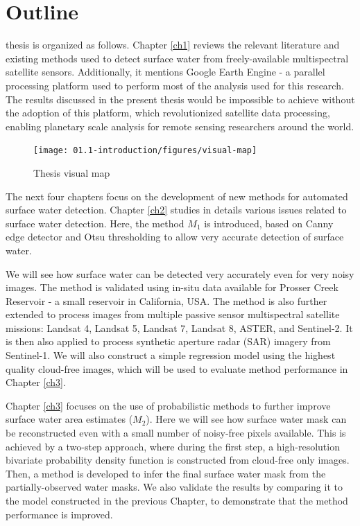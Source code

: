 \section{Outline}

 thesis is organized as follows. Chapter \ref{ch1} reviews the relevant literature and existing methods used to detect surface water from freely-available multispectral satellite sensors. Additionally, it mentions Google Earth Engine - a parallel processing platform used to perform most of the analysis used for this research. The results discussed in the present thesis would be impossible to achieve without the adoption of this platform, which revolutionized satellite data processing, enabling planetary scale analysis for remote sensing researchers around the world. 

\begin{figure}[H]
	\texttt{[image: 01.1-introduction/figures/visual-map]}
	\caption{Thesis visual map}
	\label{fig:outline}
\end{figure}

The next four chapters focus on the development of new methods for automated surface water detection. Chapter \ref{ch2} studies in details various issues related to surface water detection. Here, the method $M_1$ is introduced, based on Canny edge detector and Otsu thresholding to allow very accurate detection of surface water. 

We will see how surface water can be detected very accurately even for very noisy images. The method is validated using in-situ data available for Prosser Creek Reservoir - a small reservoir in California, USA. The method is also further extended to process images from multiple passive sensor multispectral satellite missions: Landsat 4, Landsat 5, Landsat 7, Landsat 8, ASTER, and Sentinel-2. It is then also applied to process synthetic aperture radar (SAR) imagery from Sentinel-1. We will also construct a simple regression model using the highest quality cloud-free images, which will be used to evaluate method performance in Chapter \ref{ch3}. 

Chapter \ref{ch3} focuses on the use of probabilistic methods to further improve surface water area estimates ($M_2$). Here we will see how surface water mask can be reconstructed even with a small number of noisy-free pixels available. This is achieved by a two-step approach, where during the first step, a high-resolution bivariate probability density function is constructed from cloud-free only images. Then, a method is developed to infer the final surface water mask from the partially-observed water masks. We also validate the results by comparing it to the model constructed in the previous Chapter, to demonstrate that the method performance is improved.

